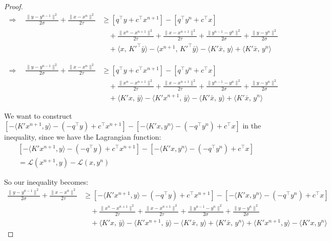 \documentclass[twoside,12pt,openright]{report}  %
\begin{document}
\begin{proof}
\[
\begin{aligned}
\Rightarrow \quad
 \frac{\|y - y^{n-1}\|^2}{2\sigma} + \frac{\|x - x^n\|^2}{2\tau} &\geq [q^\top y + c^\top x^{n+1}] - [q^\top y^{n} + c^\top x] \\
& \quad + \frac{\|x^n - x^{n+1}\|^2}{2\tau} + \frac{\|x - x^{n+1}\|^2}{2\tau} + \frac{\|y^{n-1} - y^{n}\|^2}{2\sigma} + \frac{\|y - y^{n}\|^2}{2\sigma} \\
& \quad + \langle x,\, K'^\top \bar{y} \rangle - \langle x^{n+1},\, K'^\top \bar{y} \rangle - \langle K' \bar{x},\, y \rangle + \langle K' \bar{x},\, y^{n} \rangle
\end{aligned}
\]

\[
\begin{aligned}
\Rightarrow \quad
 \frac{\|y - y^{n-1}\|^2}{2\sigma} + \frac{\|x - x^n\|^2}{2\tau} &\geq [q^\top y + c^\top x^{n+1}] - [q^\top y^{n} + c^\top x] \\
& \quad + \frac{\|x^n - x^{n+1}\|^2}{2\tau} + \frac{\|x - x^{n+1}\|^2}{2\tau} + \frac{\|y^{n-1} - y^{n}\|^2}{2\sigma} + \frac{\|y - y^{n}\|^2}{2\sigma} \\
& \quad + \langle K' x,\, \bar{y} \rangle - \langle K' x^{n+1},\, \bar{y} \rangle - \langle K' \bar{x},\, y \rangle + \langle K' \bar{x},\, y^{n} \rangle
\end{aligned}
\]

We want to construct \([-\langle K'x^{n+1},y\rangle - (-q^\top y) + c^\top x^{n+1}] - [-\langle K'x,y^{n}\rangle - (-q^\top y^{n}) + c^\top x] \) in the inequality, since we have the Lagrangian function: 
\[
\begin{aligned}
    &[-\langle K'x^{n+1},y\rangle - (-q^\top y) + c^\top x^{n+1}] - [-\langle K'x,y^{n}\rangle - (-q^\top y^{n}) + c^\top x] \\
    &= \mathcal{L}(x^{n+1},y)-\mathcal{L}(x,y^n)
\end{aligned}
\]

So our inequality becomes:
\[
\begin{aligned}
 \frac{\|y - y^{n-1}\|^2}{2\sigma} + \frac{\|x - x^n\|^2}{2\tau} &\geq [-\langle K'x^{n+1},y\rangle - (-q^\top y) + c^\top x^{n+1}] - [-\langle K'x,y^{n}\rangle - (-q^\top y^{n}) + c^\top x] \\
& \quad + \frac{\|x^n - x^{n+1}\|^2}{2\tau} + \frac{\|x - x^{n+1}\|^2}{2\tau} + \frac{\|y^{n-1} - y^{n}\|^2}{2\sigma} + \frac{\|y - y^{n}\|^2}{2\sigma} \\
& \quad + \langle K' x,\, \bar{y} \rangle - \langle K' x^{n+1},\, \bar{y} \rangle - \langle K' \bar{x},\, y \rangle + \langle K' \bar{x},\, y^{n} \rangle + \langle K'x^{n+1},y\rangle - \langle K'x,y^{n}\rangle
\end{aligned}
\]


\end{proof}
\end{document}
